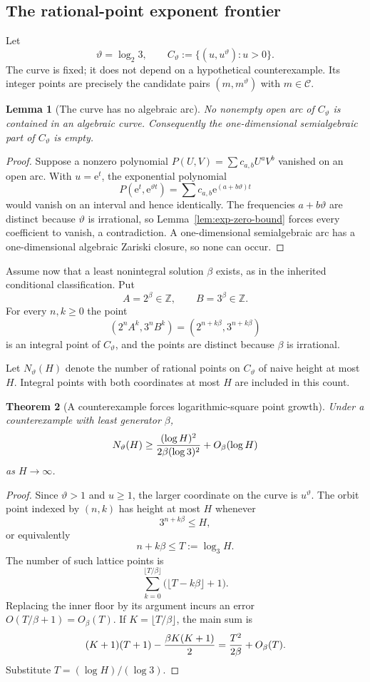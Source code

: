 \documentclass[11pt,oneside]{article}
\newtheorem{theorem}{Theorem}[section]
\newtheorem{lemma}[theorem]{Lemma}
\theoremstyle{definition}
\theoremstyle{remark}
\newcommand{\Z}{\mathbb Z}
\newcommand{\thetaq}{\vartheta}
\newcommand{\Cand}{\mathcal C}
\newcommand{\ee}{\mathrm e}
\begin{document}
\subsection{The rational-point exponent frontier}
\label{sec:sparse-pointcount}

Let
\[
  \thetaq=\log_2 3,
  \qquad
  C_{\thetaq}:=\{(u,u^{\thetaq}):u>0\}.
\]
The curve is fixed; it does not depend on a hypothetical counterexample.  Its integer points
are precisely the candidate pairs $(m,m^{\thetaq})$ with $m\in\Cand$.

\begin{lemma}[The curve has no algebraic arc]
\label{lem:no-algebraic-arc}
No nonempty open arc of $C_{\thetaq}$ is contained in an algebraic curve.  Consequently the
one-dimensional semialgebraic part of $C_{\thetaq}$ is empty.
\end{lemma}

\begin{proof}
Suppose a nonzero polynomial $P(U,V)=\sum c_{a,b}U^aV^b$ vanished on an open arc.  With
$u=\ee^t$, the exponential polynomial
\[
  P(\ee^t,\ee^{\thetaq t})
  =\sum c_{a,b}\ee^{(a+b\thetaq)t}
\]
would vanish on an interval and hence identically.  The frequencies $a+b\thetaq$ are distinct
because $\thetaq$ is irrational, so Lemma~\ref{lem:exp-zero-bound} forces every coefficient
to vanish, a contradiction.  A one-dimensional semialgebraic arc has a one-dimensional
algebraic Zariski closure, so none can occur.
\end{proof}

Assume now that a least nonintegral solution $\beta$ exists, as in the inherited conditional
classification.  Put
\[
  A=2^\beta\in\Z,
  \qquad
  B=3^\beta\in\Z.
\]
For every $n,k\ge0$ the point
\[
  (2^nA^k,3^nB^k)
  =(2^{n+k\beta},3^{n+k\beta})
\]
is an integral point of $C_{\thetaq}$, and the points are distinct because $\beta$ is
irrational.

Let $N_{\thetaq}(H)$ denote the number of rational points on $C_{\thetaq}$ of naive height at
most $H$.  Integral points with both coordinates at most $H$ are included in this count.

\begin{theorem}[A counterexample forces logarithmic-square point growth]
\label{thm:log-square-points}
Under a counterexample with least generator $\beta$,
\[
  N_{\thetaq}(H)
  \ge
  { (\log H)^2\over 2\beta(\log3)^2}
  +O_\beta(\log H)
\]
as $H\to\infty$.
\end{theorem}

\begin{proof}
Since $\thetaq>1$ and $u\ge1$, the larger coordinate on the curve is
$u^{\thetaq}$.  The orbit point indexed by $(n,k)$ has height at most $H$ whenever
\[
  3^{n+k\beta}\le H,
\]
or equivalently
\[
  n+k\beta\le T:=\log_3H.
\]
The number of such lattice points is
\[
  \sum_{k=0}^{\lfloor T/\beta\rfloor}
       \bigl(\lfloor T-k\beta\rfloor+1\bigr).
\]
Replacing the inner floor by its argument incurs an error
$O(T/\beta+1)=O_\beta(T)$.  If $K=\lfloor T/\beta\rfloor$, the main sum is
\[
  (K+1)(T+1)-{\beta K(K+1)\over2}
  ={T^2\over2\beta}+O_\beta(T).
\]
Substitute $T=(\log H)/(\log3)$.
\end{proof}
\end{document}
